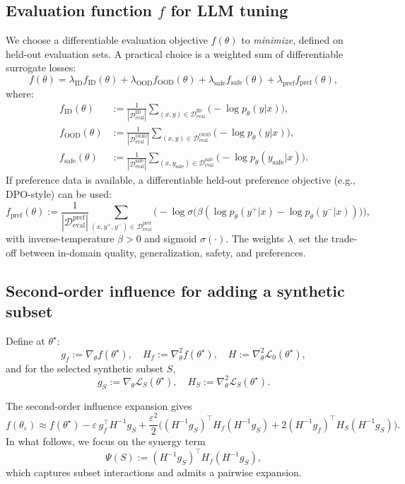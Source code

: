 \documentclass{article}
\theoremstyle{plain}
\theoremstyle{definition}
\theoremstyle{remark}
\begin{document}
\subsection{Evaluation function $f$ for LLM tuning}
We choose a differentiable evaluation objective $f(\theta)$ to \emph{minimize}, defined on held-out evaluation sets.
A practical choice is a weighted sum of differentiable surrogate losses:
\[
f(\theta) = \lambda_{\mathrm{ID}} f_{\mathrm{ID}}(\theta) + \lambda_{\mathrm{OOD}} f_{\mathrm{OOD}}(\theta)
+ \lambda_{\mathrm{safe}} f_{\mathrm{safe}}(\theta) + \lambda_{\mathrm{pref}} f_{\mathrm{pref}}(\theta),
\]
where:
\begin{align*}
f_{\mathrm{ID}}(\theta)
&:= \frac{1}{|\mathcal{D}_{\mathrm{eval}}^{\mathrm{ID}}|}\sum_{(x,y)\in \mathcal{D}_{\mathrm{eval}}^{\mathrm{ID}}} \big(-\log p_\theta(y|x)\big),\\
f_{\mathrm{OOD}}(\theta)
&:= \frac{1}{|\mathcal{D}_{\mathrm{eval}}^{\mathrm{OOD}}|}\sum_{(x,y)\in \mathcal{D}_{\mathrm{eval}}^{\mathrm{OOD}}} \big(-\log p_\theta(y|x)\big),\\
f_{\mathrm{safe}}(\theta)
&:= \frac{1}{|\mathcal{D}_{\mathrm{eval}}^{\mathrm{safe}}|}\sum_{(x,y_{\mathrm{safe}})\in \mathcal{D}_{\mathrm{eval}}^{\mathrm{safe}}} \big(-\log p_\theta(y_{\mathrm{safe}}|x)\big).
\end{align*}
If preference data is available, a differentiable held-out preference objective (e.g., DPO-style) can be used:
\[
f_{\mathrm{pref}}(\theta)
:= \frac{1}{|\mathcal{D}_{\mathrm{eval}}^{\mathrm{pref}}|}\sum_{(x,y^+,y^-)\in \mathcal{D}_{\mathrm{eval}}^{\mathrm{pref}}}
\Big(-\log \sigma\big(\beta(\log p_\theta(y^+|x)-\log p_\theta(y^-|x))\big)\Big),
\]
with inverse-temperature $\beta>0$ and sigmoid $\sigma(\cdot)$.
The weights $\lambda_\cdot$ set the trade-off between in-domain quality, generalization, safety, and preferences.

\subsection{Second-order influence for adding a synthetic subset}
Define at $\theta^\star$:
\[
g_f := \nabla_\theta f(\theta^\star), \quad H_f := \nabla_\theta^2 f(\theta^\star), \quad
H := \nabla_\theta^2 \mathcal{L}_0(\theta^\star),
\]
and for the selected synthetic subset $S$,
\[
g_S := \nabla_\theta \mathcal{L}_{S}(\theta^\star), \quad H_S := \nabla_\theta^2 \mathcal{L}_{S}(\theta^\star).
\]

The second-order influence expansion gives
\begin{equation}
f(\theta_\varepsilon)
\approx
f(\theta^\star)
-\varepsilon \, g_f^\top H^{-1} g_S
+\frac{\varepsilon^2}{2}
\Big(
(H^{-1}g_S)^\top H_f (H^{-1}g_S)
+2(H^{-1}g_f)^\top H_S (H^{-1}g_S)
\Big).
\label{eq:second_order_if}
\end{equation}
In what follows, we focus on the synergy term
\[
\Psi(S) := (H^{-1}g_S)^\top H_f (H^{-1}g_S),
\]
which captures subset interactions and admits a pairwise expansion.
\end{document}
